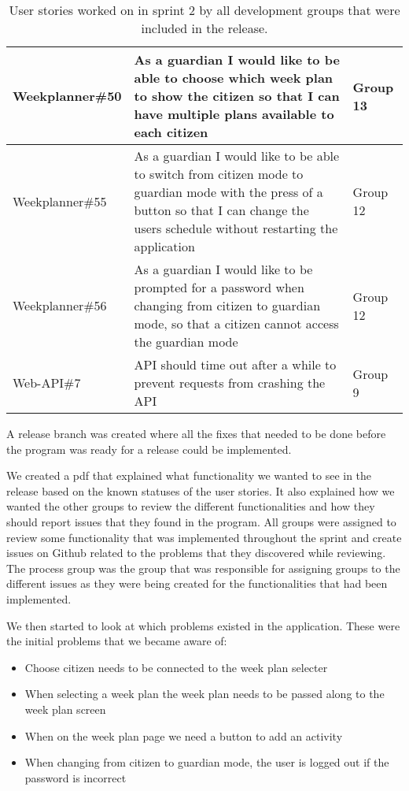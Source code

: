 \begin{table}[H]
\begin{tabular}{|p{2.8cm}|p{7cm}|p{2cm}|}
    Weekplanner\#50 & As a guardian I would like to be able to choose which week plan to show the citizen so that I can have multiple plans available to each citizen                                          & Group 13            \\ \hline
    Weekplanner\#55 & As a guardian I would like to be able to switch from citizen mode to guardian mode with the press of a button so that I can change the users schedule without restarting the application & Group 12            \\ \hline
    Weekplanner\#56 & As a guardian I would like to be prompted for a password when changing from citizen to guardian mode, so that a citizen cannot access the guardian mode                                  & Group 12            \\ \hline
    Web-API\#7      & API should time out after a while to prevent requests from crashing the API                                                                                                              & Group 9             \\ \hline
    \end{tabular}
    \caption{User stories worked on in sprint 2 by all development groups that were included in the release.}\label{table:user-stories-sprint-2-release}
\end{table}

\noindent A release branch was created where all the fixes that needed to be done before the program was ready for a release could be implemented.

\noindent We created a pdf that explained what functionality we wanted to see in the release based on the known statuses of the user stories.
It also explained how we wanted the other groups to review the different functionalities and how they should report issues that they found in the program.
All groups were assigned to review some functionality that was implemented throughout the sprint and create issues on Github related to the problems that they discovered while reviewing. 
The process group was the group that was responsible for assigning groups to the different issues as they were being created for the functionalities that had been implemented. 

\noindent We then started to look at which problems existed in the application.
These were the initial problems that we became aware of:
\begin{itemize}
    \item Choose citizen needs to be connected to the week plan selecter
    \item When selecting a week plan the week plan needs to be passed along to the week plan screen
    \item When on the week plan page we need a button to add an activity
    \item When changing from citizen to guardian mode, the user is logged out if the password is incorrect
\end{itemize}

